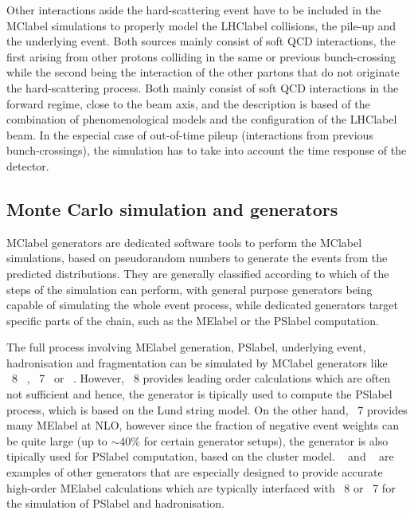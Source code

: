 Other interactions aside the hard-scattering event have to be included in the \acrshort{MClabel} simulations to properly model the \acrshort{LHClabel} collisions, the pile-up and the underlying event. Both sources mainly consist of soft \acrshort{QCD} interactions, the first arising from other protons colliding in the same or previous bunch-crossing while the second being the interaction of the other partons that do not originate the hard-scattering process. Both mainly consist of soft \acrshort{QCD} interactions in the forward regime, close to the beam axis, and the description is based of the combination of phenomenological models and the configuration of the \acrshort{LHClabel} beam. In the especial case of out-of-time pileup (interactions from previous bunch-crossings), the simulation has to take into account the time response of the detector.

\subsection{Monte Carlo simulation and generators}
\label{subsec:MCsimulation}
\acrshort{MClabel} generators are dedicated software tools to perform the \acrshort{MClabel} simulations, based on pseudorandom numbers to generate the events from the predicted distributions. They are generally classified according to which of the steps of the simulation can perform, with general purpose generators being capable of simulating the whole event process, while dedicated generators target specific parts of the chain, such as the \acrshort{MElabel} or the \acrshort{PSlabel} computation.

The full process involving \acrshort{MElabel} generation, \acrshort{PSlabel}, underlying event, hadronisation and fragmentation can be simulated by \acrshort{MClabel} generators like \PYTHIA~8~\cite{SJOSTRAND2015159}
, \HERWIG~7~\cite{Bahr2008,Bellm2016}
or \SHERPA~\cite{10.21468SciPostPhys.7.3.034}. However, \PYTHIA~8 provides leading order calculations which are often not sufficient and hence, the generator is tipically used to compute the \acrshort{PSlabel} process, which is based on the Lund string model. On the other hand, \HERWIG~7 provides many \acrshort{MElabel} at NLO, however since the fraction of negative event weights can be quite large (up to $\sim40\%$ for certain generator setups), the generator is also tipically used for \acrshort{PSlabel} computation, based on the cluster model. \POWHEGBOX~\cite{Nason_2004,Frixione_2007,Alioli2010,PhysRevD.91.094003,Frixione_20072}
and \MGMCatNLO~\cite{Alwall_2007}
are examples of other generators that are especially designed to provide accurate high-order \acrshort{MElabel} calculations which are typically interfaced with \PYTHIA~8 or \HERWIG~7 for the simulation of \acrshort{PSlabel} and hadronisation. 

